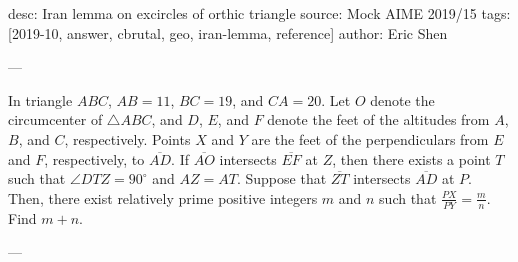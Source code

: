 desc: Iran lemma on excircles of orthic triangle
source: Mock AIME 2019/15
tags: [2019-10, answer, cbrutal, geo, iran-lemma, reference]
author: Eric Shen

---

In triangle $ABC$, $AB=11$, $BC=19$, and $CA=20$. Let $O$ denote the circumcenter of $\triangle ABC$, and $D$, $E$, and $F$ denote the feet of the altitudes from $A$, $B$, and $C$, respectively. Points $X$ and $Y$ are the feet of the perpendiculars from $E$ and $F$, respectively, to $\overline{AD}$. If $\overline{AO}$ intersects $\overline{EF}$ at $Z$, then there exists a point $T$ such that $\angle DTZ=90^\circ$ and $AZ=AT$. Suppose that $\overline{ZT}$ intersects $\overline{AD}$ at $P$. Then, there exist relatively prime positive integers $m$ and $n$ such that $\tfrac{PX}{PY}=\tfrac mn$. Find $m+n$.

---


